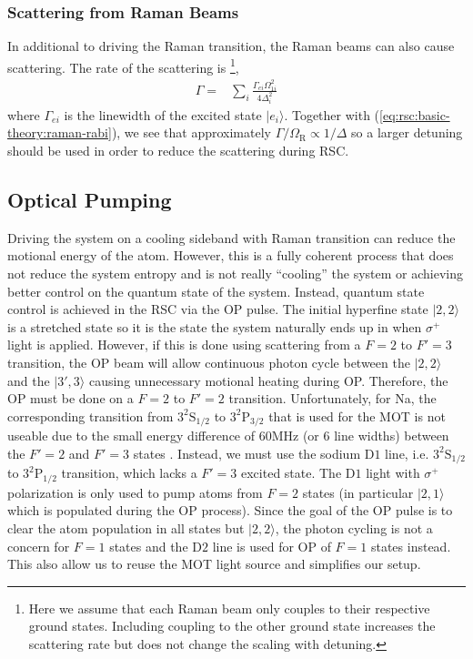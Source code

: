 \subsubsection{Scattering from Raman Beams}
\label{ch:rsc:basic-theory:raman-scatter}

In additional to driving the Raman transition, the Raman beams can also cause scattering.
The rate of the scattering is
\footnote{Here we assume that each Raman beam only couples to their respective ground states.
  Including coupling to the other ground state increases the scattering rate but does not change
  the scaling with detuning.},
\begin{align*}
  \Gamma=&\sum_{i}\frac{\Gamma_{ei}\Omega_{1i}^2}{4\Delta_i^2}
\end{align*}
where $\Gamma_{ei}$ is the linewidth of the excited state $|e_i\rangle$.
Together with (\ref{eq:rsc:basic-theory:raman-rabi}), we see that approximately
$\Gamma/\Omega_{\mathrm{R}}\propto1/\Delta$ so a larger detuning should be used
in order to reduce the scattering during RSC.

\subsection{Optical Pumping}
\label{ch:rsc:basic-theory:op}

Driving the system on a cooling sideband with Raman transition can reduce the
motional energy of the atom. However, this is a fully coherent process that does
not reduce the system entropy and is not really ``cooling'' the system
or achieving better control on the quantum state of the system.
Instead, quantum state control is achieved in the RSC via the OP pulse.
The initial hyperfine state $|2,2\rangle$ is a stretched state so it is the
state the system naturally ends up in when $\sigma^+$ light is applied.
However, if this is done using scattering from a $F=2$ to $F'=3$ transition,
the OP beam will allow continuous photon cycle
between the $|2,2\rangle$ and the $|3',3\rangle$ causing unnecessary motional heating during OP.
Therefore, the OP must be done on a $F=2$ to $F'=2$ transition.
Unfortunately, for Na, the corresponding transition
from $\mathrm{3^2S_{1/2}}$ to $\mathrm{3^2P_{3/2}}$
that is used for the MOT is not useable due to the small energy difference of
$60 \mathrm{MHz}$ (or $6$ line widths) between the $F'=2$ and $F'=3$ states
\cite{steck_sodium_nodate}.
Instead, we must use the sodium $\mathrm{D1}$ line,
i.e. $\mathrm{3^2S_{1/2}}$ to $\mathrm{3^2P_{1/2}}$ transition,
which lacks a $F'=3$ excited state.
The $\mathrm{D1}$ light with $\sigma^+$ polarization is only used to pump atoms from
$F=2$ states (in particular $|2,1\rangle$ which is populated during the OP process).
Since the goal of the OP pulse is to clear the atom population in all states but $|2,2\rangle$,
the photon cycling is not a concern for $F=1$ states and the $\mathrm{D2}$ line
is used for OP of $F=1$ states instead.
This also allow us to reuse the MOT light source and simplifies our setup.

